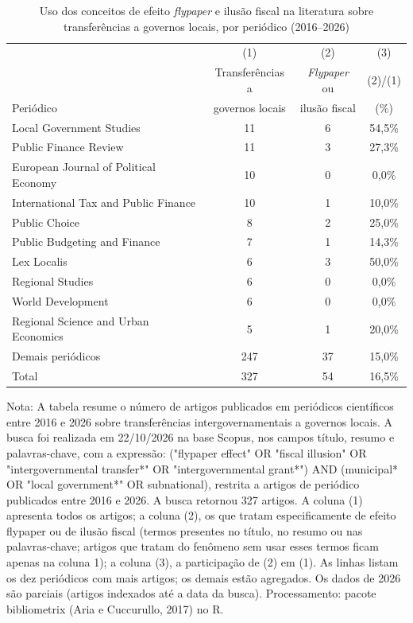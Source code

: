 \begin{table}[H]
\centering\footnotesize\setlength{\tabcolsep}{5pt}
\caption{Uso dos conceitos de efeito \textit{flypaper} e ilusão fiscal na literatura sobre transferências a governos locais, por periódico (2016--2026)}
\label{tab:bibliometria}
\begin{threeparttable}
\begin{tabular}{lccc}
\toprule
 & (1) & (2) & (3) \\
 & Transferências a & \textit{Flypaper} ou & (2)/(1) \\
Periódico & governos locais & ilusão fiscal & (\%) \\
\midrule
Local Government Studies & 11 & 6 & 54,5\% \\
Public Finance Review & 11 & 3 & 27,3\% \\
European Journal of Political Economy & 10 & 0 & 0,0\% \\
International Tax and Public Finance & 10 & 1 & 10,0\% \\
Public Choice & 8 & 2 & 25,0\% \\
Public Budgeting and Finance & 7 & 1 & 14,3\% \\
Lex Localis & 6 & 3 & 50,0\% \\
Regional Studies & 6 & 0 & 0,0\% \\
World Development & 6 & 0 & 0,0\% \\
Regional Science and Urban Economics & 5 & 1 & 20,0\% \\
Demais periódicos & 247 & 37 & 15,0\% \\
\midrule
Total & 327 & 54 & 16,5\% \\
\bottomrule
\end{tabular}
\begin{tablenotes}[flushleft]\footnotesize
\item Nota: A tabela resume o número de artigos publicados em periódicos científicos entre 2016 e 2026 sobre transferências intergovernamentais a governos locais. A busca foi realizada em 22/10/2026 na base Scopus, nos campos título, resumo e palavras-chave, com a expressão: ("flypaper effect" OR "fiscal illusion" OR "intergovernmental transfer*" OR "intergovernmental grant*") AND (municipal* OR "local government*" OR subnational), restrita a artigos de periódico publicados entre 2016 e 2026. A busca retornou 327 artigos. A coluna (1) apresenta todos os artigos; a coluna (2), os que tratam especificamente de efeito flypaper ou de ilusão fiscal (termos presentes no título, no resumo ou nas palavras-chave; artigos que tratam do fenômeno sem usar esses termos ficam apenas na coluna 1); a coluna (3), a participação de (2) em (1). As linhas listam os dez periódicos com mais artigos; os demais estão agregados. Os dados de 2026 são parciais (artigos indexados até a data da busca). Processamento: pacote bibliometrix (Aria e Cuccurullo, 2017) no R.
\end{tablenotes}
\end{threeparttable}
\end{table}
